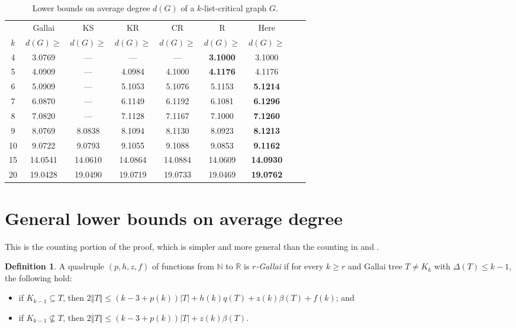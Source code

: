 \documentclass[10pt]{article}
\theoremstyle{plain}
\theoremstyle{definition}
\newtheorem{defn}{Definition}
\theoremstyle{remark}
\newcommand{\IN}{\mathbb{N}}
\newcommand{\IR}{\mathbb{R}}
\newcommand{\card}[1]{\left|#1\right|}
\newcommand{\size}[1]{\left\Vert#1\right\Vert}
\newcommand{\parens}[1]{\left( #1 \right)}
\begin{document}
\begin{table}
	\begin{center}
		\begin{tabular}{|c|c|c|c|c|c|c|c|c|}
			\hline
			& Gallai \cite{gallai1963kritische}
			& KS \cite{kostochkastiebitzedgesincriticalgraph} 
			& KR \cite{OreVizing}
			& CR \cite{DischargingLowerBound}
			& R \cite{Better4ListCriticalBound}
			& Here \\
			$k$ & $d(G) \ge$ & $d(G) \ge$ & $d(G) \ge$ & $d(G) \ge$ & $d(G) \ge$ & $d(G) \ge$\\
			\hline 
			4 & 3.0769 & --- & --- & --- & \bf{3.1000} & 3.1000\\
			5 & 4.0909 & --- & 4.0984 & 4.1000 & \bf{4.1176} & 4.1176\\
			6 & 5.0909 & --- & 5.1053 & 5.1076 & 5.1153 & \bf{5.1214}\\
			7 & 6.0870 & --- & 6.1149 & 6.1192} & 6.1081 & \bf{6.1296}\\
			8 & 7.0820 & --- & 7.1128 & 7.1167} & 7.1000 & \bf{7.1260}\\
			9 & 8.0769 & 8.0838 & 8.1094 & 8.1130} & 8.0923 & \bf{8.1213}\\
			10 & 9.0722 & 9.0793 & 9.1055 & 9.1088} & 9.0853 & \bf{9.1162}\\
			15 & 14.0541 & 14.0610 & 14.0864 & 14.0884} & 14.0609 & \bf{14.0930}\\
			20 & 19.0428 & 19.0490 & 19.0719 & 19.0733} & 19.0469 & \bf{19.0762}\\
			\hline
		\end{tabular}
	\end{center}
	\caption{Lower bounds on average degree $d(G)$ of a $k$-list-critical graph $G$.}
	\label{TheTable}
\end{table}

\section{General lower bounds on average degree}
This is the counting portion of the proof, which is simpler and more general than the counting in \cite{OreVizing} and \cite{DischargingLowerBound}.
\begin{defn}
A quadruple $\parens{p,h,z,f}$ of functions from $\IN$ to $\IR$ is \emph{$r$-Gallai} if for every $k \ge r$ and Gallai tree $T \ne K_k$ with $\Delta(T) \le k-1$,
the following hold:
\begin{itemize}
\item if $K_{k-1} \subseteq T$, then $2\size{T} \le \parens{k-3 + p(k)}\card{T} + h(k)q(T) + z(k)\beta(T) + f(k)$; and
\item if $K_{k-1} \not\subseteq T$, then $2\size{T} \le \parens{k-3 + p(k)}\card{T} + z(k)\beta(T)$.
\end{itemize}
\end{defn}
\end{document}
